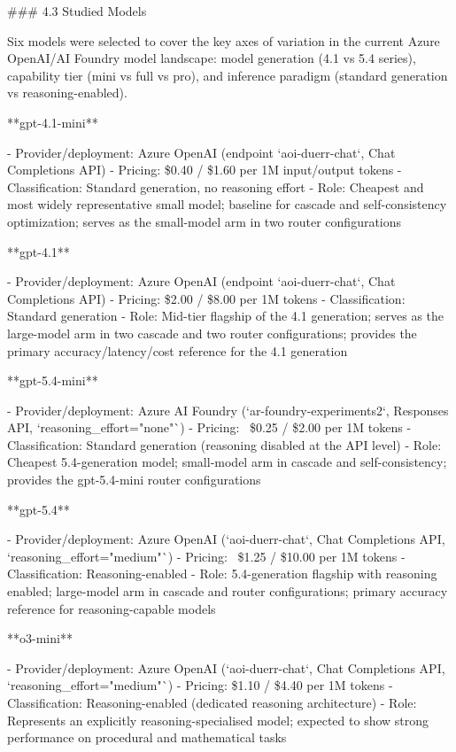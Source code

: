 ### 4.3 Studied Models

Six models were selected to cover the key axes of variation in the current Azure OpenAI/AI Foundry model landscape: model generation (4.1 vs 5.4 series), capability tier (mini vs full vs pro), and inference paradigm (standard generation vs reasoning-enabled).

**gpt-4.1-mini**

- Provider/deployment: Azure OpenAI (endpoint `aoi-duerr-chat`, Chat Completions API)
- Pricing: \$0.40 / \$1.60 per 1M input/output tokens
- Classification: Standard generation, no reasoning effort
- Role: Cheapest and most widely representative small model; baseline for cascade and self-consistency optimization; serves as the small-model arm in two router configurations

**gpt-4.1**

- Provider/deployment: Azure OpenAI (endpoint `aoi-duerr-chat`, Chat Completions API)
- Pricing: \$2.00 / \$8.00 per 1M tokens
- Classification: Standard generation
- Role: Mid-tier flagship of the 4.1 generation; serves as the large-model arm in two cascade and two router configurations; provides the primary accuracy/latency/cost reference for the 4.1 generation

**gpt-5.4-mini**

- Provider/deployment: Azure AI Foundry (`ar-foundry-experiments2`, Responses API, `reasoning_effort="none"`)
- Pricing: ~\$0.25 / \$2.00 per 1M tokens
- Classification: Standard generation (reasoning disabled at the API level)
- Role: Cheapest 5.4-generation model; small-model arm in cascade and self-consistency; provides the gpt-5.4-mini router configurations

**gpt-5.4**

- Provider/deployment: Azure OpenAI (`aoi-duerr-chat`, Chat Completions API, `reasoning_effort="medium"`)
- Pricing: ~\$1.25 / \$10.00 per 1M tokens
- Classification: Reasoning-enabled
- Role: 5.4-generation flagship with reasoning enabled; large-model arm in cascade and router configurations; primary accuracy reference for reasoning-capable models

**o3-mini**

- Provider/deployment: Azure OpenAI (`aoi-duerr-chat`, Chat Completions API, `reasoning_effort="medium"`)
- Pricing: \$1.10 / \$4.40 per 1M tokens
- Classification: Reasoning-enabled (dedicated reasoning architecture)
- Role: Represents an explicitly reasoning-specialised model; expected to show strong performance on procedural and mathematical tasks

